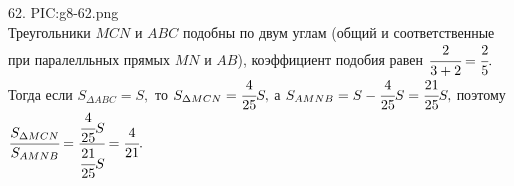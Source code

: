 62. {{PIC:g8-62.png}}\\
Треугольники $MCN$ и $ABC$ подобны по двум углам (общий и соответственные при паралелльных прямых $MN$ и $AB$), коэффициент подобия равен $\cfrac{2}{3+2}=\cfrac{2}{5}.$ Тогда если $S_{\Delta ABC}=S,$ то $S_{\Delta MCN}=\cfrac{4}{25}S,$ а $S_{AMNB}=S-\cfrac{4}{25}S=\cfrac{21}{25}S,$ поэтому $\cfrac{S_{\Delta MCN}}{S_{AMNB}}=\cfrac{\cfrac{4}{25}S}{\cfrac{21}{25}S}=\cfrac{4}{21}.$\\
